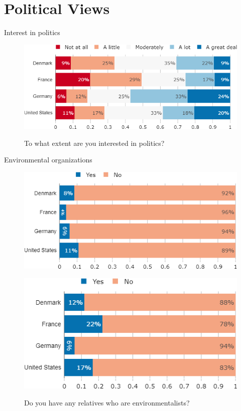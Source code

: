 \documentclass[aspectratio=169,9pt,dvipsnames]{beamer}
\begin{document}

\section{Political Views}

\begin{frame}{Interest in politics }%
\vspace{-.5cm}
\begin{figure}[h!]
\caption{To what extent are you interested in politics?}
\includegraphics[width=.6\textwidth]{../figures/country_comparison/interested_politics_countries.png} \\
\end{figure}
\end{frame}

\begin{frame}{Environmental organizations}%
\vspace{-.5cm}
\begin{figure}[h!]
\caption{Are you member of an environmental organization?}
\includegraphics[width=.45\textwidth]{../figures/country_comparison/member_environmental_orga_countries.png}\\
\vspace{.1cm}
\caption{Do you have any relatives who are environmentalists?}
\includegraphics[width=.45\textwidth]{../figures/country_comparison/relative_environmentalist_countries.png}\\
\end{figure}
\end{frame}
\end{document}
